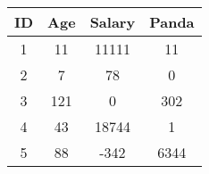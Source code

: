 
\begin{tabular}{||c c c c||}
	\hline
	ID & Age & Salary & Panda \\
	\hline\hline
	1 & 11 & 11111 & 11 \\
	\hline
	2 & 7 & 78 & 0 \\
	\hline
	3 & 121 & 0 & 302 \\
	\hline
	4 & 43 & 18744 & 1 \\
	\hline
	5 & 88 & -342 & 6344 \\
	\hline
\end{tabular}
